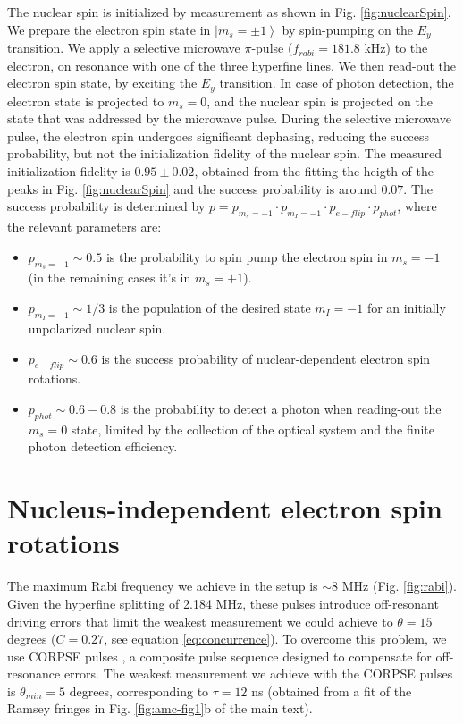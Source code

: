 The nuclear spin is initialized by measurement \cite{Pfaff_NatPhys_2012} as shown in Fig. \ref{fig:nuclearSpin}. We prepare the electron spin state in $\left| m_s=\pm 1 \right \rangle$ by spin-pumping on the $E_{y}$ transition. We apply a selective microwave $\pi$-pulse ($f_{rabi} = 181.8$ kHz) to the electron, on resonance with one of the three hyperfine lines. We then read-out the electron spin state, by exciting the $E_y$ transition. In case of photon detection, the electron state is projected to $m_s=0$, and the nuclear spin is projected on the state that was addressed by the microwave pulse.
During the selective microwave pulse, the electron spin undergoes significant dephasing, reducing the success probability, but not the initialization fidelity of the nuclear spin. The measured initialization fidelity is $0.95 \pm 0.02$, obtained from the fitting the heigth of the peaks in Fig. \ref{fig:nuclearSpin}  and the success probability is around $0.07$. The success probability is determined by $p = p_{m_s=-1} \cdot p_{m_I=-1} \cdot p_{e-flip} \cdot p_{phot}$, where the relevant parameters are:
\begin{itemize}
 \item $p_{m_s=-1} \sim 0.5$ is the probability to spin pump the electron spin in $m_s=-1$ (in the remaining cases it's in $m_s = +1$).
 \item $p_{m_I=-1} \sim 1/3$ is the population of the desired state $m_I=-1$ for an initially unpolarized nuclear spin.
 \item $p_{e-flip} \sim 0.6$ is the success probability of nuclear-dependent electron spin rotations.
 \item $ p_{phot} \sim 0.6-0.8$ is the probability to detect a photon when reading-out the $m_s=0$ state, limited by the collection of the optical system and the finite photon detection efficiency.
\end{itemize}


\section* {Nucleus-independent electron spin rotations}
\label{sec:uncond_rot_MW}
The maximum Rabi frequency we achieve in the setup is $\sim 8$ MHz (Fig. \ref{fig:rabi}). Given the hyperfine splitting of 2.184 MHz, these pulses introduce off-resonant driving errors that limit the weakest measurement we could achieve to $\theta = 15$ degrees ($C = 0.27$, see equation \ref{eq:concurrence}). To overcome this problem, we use CORPSE pulses \cite{Cummins_PRA_2003}, a composite pulse sequence designed to compensate for off-resonance errors. The weakest measurement we achieve with the CORPSE pulses is $\theta_{min} = 5$ degrees, corresponding to $\tau = 12$ ns (obtained from a fit of the Ramsey fringes in Fig. \ref{fig:amc-fig1}b of the main text).

